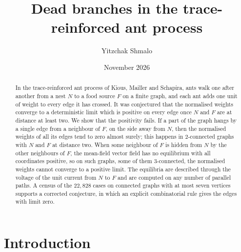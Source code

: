 \documentclass[11pt]{amsart}
\title{Dead branches in the trace-reinforced ant process}
\author{Yitzchak Shmalo}
\date{November 2026}
\theoremstyle{remark}
\begin{document}
\begin{abstract}
In the trace-reinforced ant process of Kious, Mailler and Schapira, ants walk one after another from a nest $N$ to a
food source $F$ on a finite graph, and each ant adds one unit of weight to every edge it has crossed. It was conjectured
that the normalised weights converge to a deterministic limit which is positive on every edge once $N$ and $F$ are at
distance at least two. We show that the positivity fails. If a part of the graph hangs by a single edge from a
neighbour of $F$, on the side away from $N$, then the normalised weights of all its edges tend to zero almost surely;
this happens in $2$-connected graphs with $N$ and $F$ at distance two. When some neighbour of $F$ is hidden from $N$ by
the other neighbours of $F$, the mean-field vector field has no equilibrium with all coordinates positive, so on such
graphs, some of them $3$-connected, the normalised weights cannot converge to a positive limit. The equilibria are
described through the voltage of the unit current from $N$ to $F$ and are computed on any number of parallel paths. A
census of the $22{,}828$ cases on connected graphs with at most seven vertices supports a corrected conjecture, in
which an explicit combinatorial rule gives the edges with limit zero.
\end{abstract}
\maketitle

\section{Introduction}\label{sec:intro}
\end{document}
